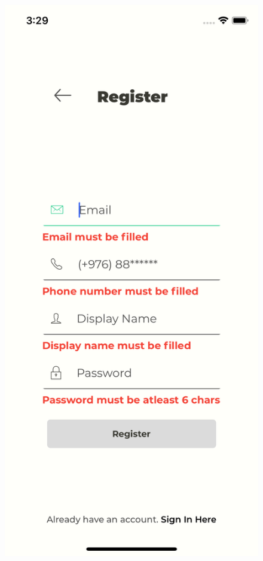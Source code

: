 \begin{figure}[H]
{        \includegraphics[height=.41\textheight, frame]{Figures/interfaces/interface3.png}
    }
    \hfill
\end{figure}

